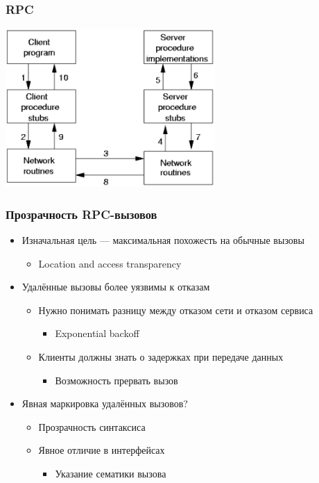 \documentclass[xetex,mathserif,serif]{beamer}
\begin{document}
    \begin{frame}
        \frametitle{RPC}
        \begin{center}
            \includegraphics[width=0.6\textwidth]{rpc.png}
        \end{center}
    \end{frame}

    \begin{frame}
        \frametitle{Прозрачность RPC-вызовов}
        \begin{itemize}
            \item Изначальная цель --- максимальная похожесть на обычные вызовы
            \begin{itemize}
                \item Location and access transparency
            \end{itemize}
            \item Удалённые вызовы более уязвимы к отказам
            \begin{itemize}
                \item Нужно понимать разницу между отказом сети и отказом сервиса
                \begin{itemize}
                    \item Exponential backoff
                \end{itemize}
                \item Клиенты должны знать о задержках при передаче данных
                \begin{itemize}
                    \item Возможность прервать вызов
                \end{itemize}
            \end{itemize}
            \item Явная маркировка удалённых вызовов?
            \begin{itemize}
                \item Прозрачность синтаксиса
                \item Явное отличие в интерфейсах
                \begin{itemize}
                    \item Указание сематики вызова
                \end{itemize}
            \end{itemize}
        \end{itemize}
    \end{frame}
\end{document}
